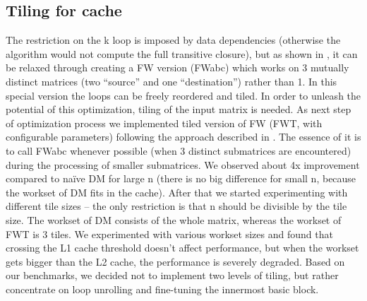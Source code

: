 \documentclass[letterpaper]{article}
\begin{document}
\subsection{Tiling for cache}
The restriction on the k loop is imposed by data dependencies 
(otherwise the algorithm would not compute the full transitive closure), 
but as shown in \cite{Pueschel2006}, it can be relaxed through creating 
a FW version (FWabc) which works on 3 mutually distinct matrices (two “source” and one “destination”) 
rather than 1. In this special version the loops can be freely reordered 
and tiled. In order to unleash the potential of this optimization, tiling 
of the input matrix is needed. As next step of optimization process we 
implemented tiled version of FW (FWT, with configurable parameters) following 
the approach described in \cite{Pueschel2006}. The 
essence of it is to call FWabc whenever possible (when 3 distinct submatrices are encountered) 
during the processing of smaller submatrices. We observed about 4x improvement 
compared to na\"ive DM for large n (there is no big difference for small n, because 
the workset of DM fits in the cache). After that we started experimenting with 
different tile sizes -- the only restriction is that n should be divisible by the 
tile size. The workset of DM consists of the whole matrix, whereas the workset 
of FWT is 3 tiles. We experimented with various workset sizes and found that 
crossing the L1 cache threshold doesn't affect performance, but when the workset 
gets bigger than the L2 cache, the performance is severely degraded. Based on our 
benchmarks, we decided not to implement two levels of tiling, but rather 
concentrate on loop unrolling and fine-tuning the innermost basic block.
\end{document}
